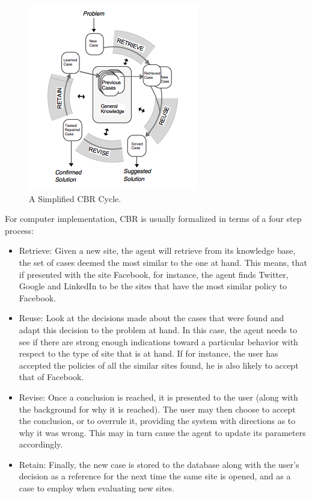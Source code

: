 \begin{figure}[htbp]
\begin{center}
\includegraphics[width = .6\textwidth]{PrelimStudy/cbrCycle}
\caption{A Simplified CBR Cycle.}
\label{cbrCycle}
\end{center}
\end{figure}


For computer implementation, CBR is usually formalized in terms of a four step process:

\begin{itemize}
\item Retrieve: 
Given a new site, the agent will retrieve from its knowledge base, the set of cases deemed the most similar to the one at hand. This means, that if presented with the site Facebook, for instance, the agent finds Twitter, Google and LinkedIn to be the sites that have the most similar policy to Facebook.
\item Reuse: 
Look at the decisions made about the cases that were found and adapt this decision to the problem at hand. In this case, the agent needs to see if there are strong enough indications toward a particular behavior with respect to the type of site that is at hand. If for instance, the user has accepted the policies of all the similar sites found, he is also likely to accept that of Facebook.
\item Revise: 
Once a conclusion is reached, it is presented to the user (along with the background for why it is reached). The user may then choose to accept the conclusion, or to overrule it, providing the system with directions as to why it was wrong. This may in turn cause the agent to update its parameters accordingly. 
\item Retain: Finally, the new case is stored to the database along with the user's decision as a reference for the next time the same site is opened, and as a case to employ when evaluating new sites.
\end{itemize}

